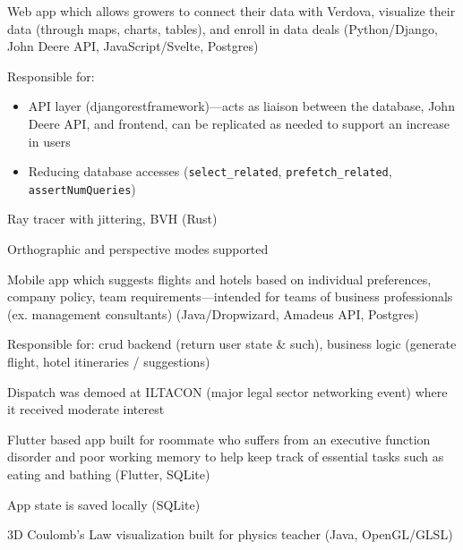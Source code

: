 \documentclass[hidelinks]{scrartcl}
\begin{document}
{
    \item Web app which allows growers to connect their data with Verdova, visualize their data (through maps, charts, tables),
    and enroll in data deals (Python/Django, John Deere API, JavaScript/Svelte, Postgres)
    \item Responsible for: 
    \begin{itemize}
        \item API layer (djangorestframework)---acts as liaison between the database, John Deere API, and frontend, 
        can be replicated as needed to support an increase in users
        \item Reducing database accesses (\texttt{select\_related}, \texttt{prefetch\_related}, \texttt{assertNumQueries})
    \end{itemize}
   
}

{
    \item Ray tracer with jittering, BVH (Rust)
    \item Orthographic and perspective modes supported
}

{
    \item Mobile app which suggests flights and hotels based on individual preferences,
    company policy, team requirements---intended for teams of business professionals 
    (ex. management consultants) (Java/Dropwizard, Amadeus API, Postgres)
    \item Responsible for: crud backend (return user state \& such), 
    business logic (generate flight, hotel itineraries / suggestions)
    \item Dispatch was demoed at ILTACON (major legal sector networking event)
    where it received moderate interest
}

{
    \item Flutter based app built for roommate who suffers from an executive 
        function disorder and poor working memory to help keep track of essential 
        tasks such as eating and bathing (Flutter, SQLite)
    \item App state is saved locally (SQLite)
}
%
{
    \item 3D Coulomb's Law visualization built for physics teacher (Java, OpenGL/GLSL)
}
\end{document}
